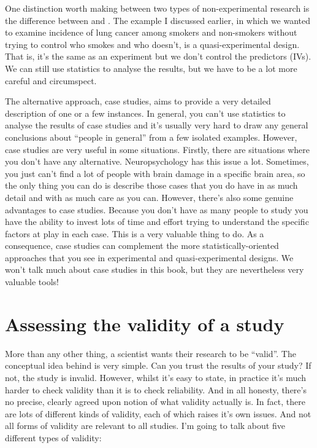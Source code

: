 One distinction worth making between two types of non-experimental research is the difference between  and . The example I discussed earlier, in which we wanted to examine incidence of lung cancer among smokers and non-smokers without trying to control who smokes and who doesn't, is a quasi-experimental design. That is, it's the same as an experiment but we don't control the predictors (IVs). We can still use statistics to analyse the results, but we have to be a lot more careful and circumspect.

The alternative approach, case studies, aims to provide a very detailed description of one or a few instances. In general, you can't use statistics to analyse the results of case studies and it's usually very hard to draw any general conclusions about ``people in general'' from a few isolated examples. However, case studies are very useful in some situations. Firstly, there are situations where you don't have any alternative. Neuropsychology has this issue a lot. Sometimes, you just can't find a lot of people with brain damage in a specific brain area, so the only thing you can do is describe those cases that you do have in as much detail and with as much care as you can. However, there's also some genuine advantages to case studies. Because you don't have as many people to study you have the ability to invest lots of time and effort trying to understand the specific factors at play in each case. This is a very valuable thing to do. As a consequence, case studies can complement the more statistically-oriented approaches that you see in experimental and quasi-experimental designs. We won't talk much about case studies in this book, but they are nevertheless very valuable tools!


\section{Assessing the validity of a study~\label{sec:validity}}

More than any other thing, a scientist wants their research to be ``valid''. The conceptual idea behind  is very simple. Can you trust the results of your study? If not, the study is invalid. However, whilst it's easy to state, in practice it's much harder to check validity than it is to check reliability. And in all honesty, there's no precise, clearly agreed upon notion of what validity actually is. In fact, there are lots of different kinds of validity, each of which raises it's own issues. And not all forms of validity are relevant to all studies. I'm going to talk about five different types of validity:

